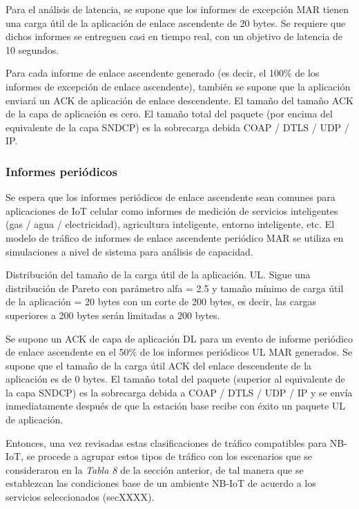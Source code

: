 Para el análisis de latencia, se supone que los informes de excepción MAR tienen una carga útil de la aplicación de enlace ascendente de 20 bytes. Se requiere que dichos informes se entreguen casi en tiempo real, con un objetivo de latencia de 10 segundos.\newline

Para cada informe de enlace ascendente generado (es decir, el 100\% de los informes de excepción de enlace ascendente), también se supone que la aplicación enviará un ACK de aplicación de enlace descendente. El tamaño del tamaño ACK de la capa de aplicación es cero. El tamaño total del paquete (por encima del equivalente de la capa SNDCP) es la sobrecarga debida COAP / DTLS / UDP / IP.\newline

\subsubsection{Informes periódicos}

Se espera que los informes periódicos de enlace ascendente sean comunes para aplicaciones de IoT celular como informes de medición de servicios inteligentes (gas / agua / electricidad), agricultura inteligente, entorno inteligente, etc. El modelo de tráfico de informes de enlace ascendente periódico MAR se utiliza en simulaciones a nivel de sistema para análisis de capacidad.\newline

Distribución del tamaño de la carga útil de la aplicación. UL. Sigue una distribución de Pareto con parámetro alfa = 2.5 y tamaño mínimo de carga útil de la aplicación = 20 bytes con un corte de 200 bytes, es decir, las cargas superiores a 200 bytes serán limitadas a 200 bytes.\newline

Se supone un ACK de capa de aplicación DL para un evento de informe periódico de enlace ascendente en el 50\% de los informes periódicos UL MAR generados. Se supone que el tamaño de la carga útil ACK del enlace descendente de la aplicación es de 0 bytes. El tamaño total del paquete (superior al equivalente de la capa SNDCP) es la sobrecarga debida a COAP / DTLS / UDP / IP y se envía inmediatamente después de que la estación base recibe con éxito un paquete UL de aplicación.\newline

Entonces, una vez revisadas estas clasificaciones de tráfico compatibles para NB-IoT, se procede a agrupar estos tipos de tráfico con los escenarios que se consideraron en la \textit{Tabla 8} de la sección anterior, de tal manera que se establezcan las condiciones base de un ambiente NB-IoT de acuerdo a los servicios seleccionados (secXXXX).\newline

